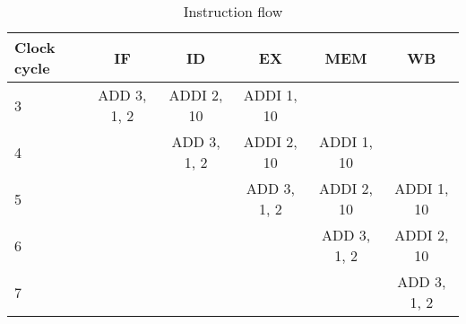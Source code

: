 \begin{table}
\center
\begin{tabular}{|l | c | c | c | c |c|}
    \hline
    Clock cycle & IF & ID & EX & MEM & WB \\
    \hline
    3 & ADD 3, 1, 2  & ADDI 2, 10 & ADDI 1, 10   &              &              \\
    4 &              & ADD 3, 1, 2  & ADDI 2, 10    & ADDI 1, 10   &              \\
    5 &              &              & ADD 3, 1, 2   & ADDI 2, 10   & ADDI 1, 10    \\
    6 &              &              &               & ADD 3, 1, 2  & ADDI 2, 10    \\
    7 &              &              &               &              & ADD 3, 1, 2  \\
    \hline
\end{tabular}
\caption{Instruction flow}
\label{testing:tbl:instrflow}
\end{table}



